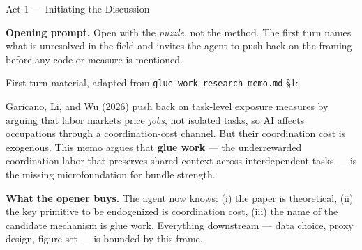 \documentclass[10pt,english,aspectratio=169]{beamer}
\begin{document}
\begin{frame}{Act 1 --- Initiating the Discussion}
\begin{tcolorbox}[colback=blue!3,colframe=RedTitle!60]
\textbf{Opening prompt.} Open with the \emph{puzzle}, not the method. The first turn names what is unresolved in the field and invites the agent to push back on the framing before any code or measure is mentioned.
\end{tcolorbox}

\vspace{0.2cm}
First-turn material, adapted from \texttt{glue\_work\_research\_memo.md} \S 1:

\begin{tcolorbox}[colback=gray!5,colframe=gray!40]
\footnotesize
Garicano, Li, and Wu (2026) push back on task-level exposure measures by arguing that labor markets price \emph{jobs}, not isolated tasks, so AI affects occupations through a coordination-cost channel. But their coordination cost is exogenous. This memo argues that \textbf{glue work} --- the underrewarded coordination labor that preserves shared context across interdependent tasks --- is the missing microfoundation for bundle strength.
\end{tcolorbox}

\vspace{0.15cm}
\textbf{What the opener buys.} The agent now knows: (i) the paper is theoretical, (ii) the key primitive to be endogenized is coordination cost, (iii) the name of the candidate mechanism is glue work. Everything downstream --- data choice, proxy design, figure set --- is bounded by this frame.
\end{frame}
\end{document}
